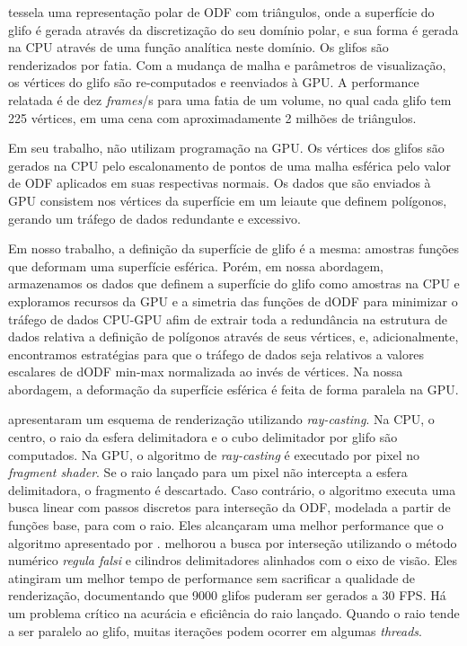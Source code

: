 
 tessela uma representação polar de ODF com triângulos, onde a superfície do glifo é gerada através da discretização do seu domínio polar, e sua forma é gerada na CPU através de uma função analítica neste domínio. Os glifos são renderizados por fatia. Com a mudança de malha e parâmetros de visualização, os vértices do glifo são re-computados e reenviados à GPU. A performance relatada é de dez \textit{frames}/s para uma fatia de um volume, no qual cada glifo tem 225 vértices, em uma cena com aproximadamente 2 milhões de triângulos.

Em seu trabalho,  não utilizam programação na GPU. Os vértices dos glifos são gerados na CPU pelo escalonamento de pontos de uma malha esférica pelo valor de ODF aplicados em suas respectivas normais. Os dados que são enviados à GPU consistem nos vértices da superfície em um leiaute que definem polígonos, gerando um tráfego de dados redundante e excessivo.

Em nosso trabalho, a definição da superfície de glifo é a mesma: amostras funções que deformam uma superfície esférica. Porém, em nossa abordagem, armazenamos os dados que definem a superfície do glifo como amostras na CPU e exploramos recursos da GPU e a simetria das funções de dODF para minimizar o tráfego de dados CPU-GPU afim de extrair toda a redundância na estrutura de dados relativa a definição de polígonos através de seus vértices, e, adicionalmente, encontramos estratégias para que o tráfego de dados seja relativos a valores escalares de dODF min-max normalizada ao invés de vértices. Na nossa abordagem, a deformação da superfície esférica é feita de forma paralela na GPU.


 apresentaram um esquema de renderização utilizando \textit{ray-casting}. Na CPU, o centro, o raio da esfera delimitadora e o cubo delimitador por glifo são computados. Na GPU, o algoritmo de \textit{ray-casting} é executado por pixel no \textit{fragment shader}. Se o raio lançado para um pixel não intercepta a esfera delimitadora, o fragmento é descartado. Caso contrário, o algoritmo executa uma busca linear com passos discretos para interseção da ODF, modelada a partir de funções base, para com o raio. Eles alcançaram uma melhor performance que o algoritmo apresentado por .  melhorou a busca por interseção utilizando o método numérico \textit{regula falsi} e cilindros delimitadores alinhados com o eixo de visão. Eles atingiram um melhor tempo de performance sem sacrificar a qualidade de renderização, documentando que 9000 glifos puderam ser gerados a 30 FPS. Há um problema crítico na acurácia e eficiência do raio lançado. Quando o raio tende a ser paralelo ao glifo, muitas iterações podem ocorrer em algumas \textit{threads}.

